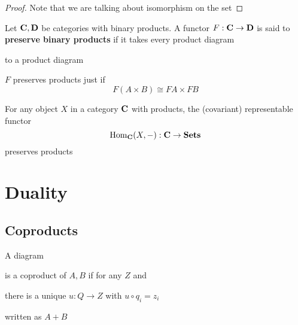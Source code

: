 \documentclass[11pt]{article}
\begin{document}
\begin{proof}
Note that we are talking about isomorphism on the set
\end{proof}

\begin{definition}[]
Let \(\operatorname{\textbf{C}},\operatorname{\textbf{D}}\) be categories with binary products. A functor
\(F:\operatorname{\textbf{C}}\to\operatorname{\textbf{D}}\) is said to \textbf{preserve binary products} if it takes every
product diagram
\begin{center}\end{center}
to a product diagram
\begin{center}\end{center}
\end{definition}
\(F\) preserves products just if
\begin{equation*}
F(A\times B)\cong FA\times FB
\end{equation*}
\begin{corollary}[]
For any object \(X\) in a category \(\operatorname{\textbf{C}}\) with products, the (covariant)
representable functor
\begin{equation*}
\operatorname{Hom}_{\operatorname{\textbf{C}}}(X,-):\operatorname{\textbf{C}}\to\operatorname{\textbf{Sets}}
\end{equation*}
preserves products
\end{corollary}

\section{Duality}
\label{sec:org2143621}

\subsection{Coproducts}
\label{sec:orgc35d225}
\begin{definition}[]
A diagram
is a coproduct of \(A,B\) if for any \(Z\) and
there is a unique \(u:Q\to Z\) with \(u\circ q_i=z_i\)
\begin{center}\end{center}
written as \(A+B\)
\end{definition}
\end{document}
